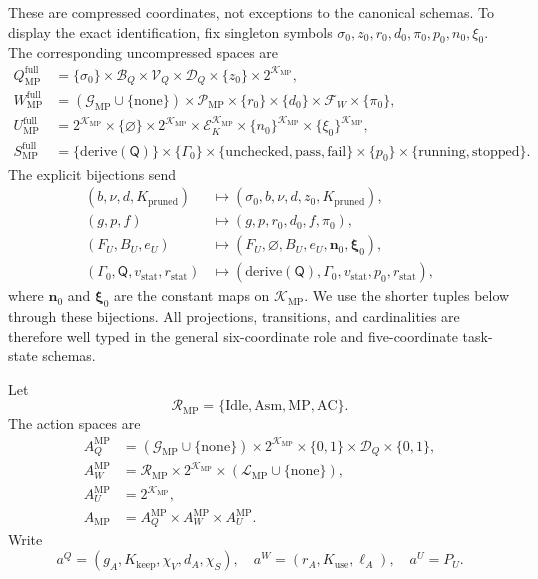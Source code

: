 \documentclass[11pt,oneside]{book}
\theoremstyle{remark}
\begin{document}
These are compressed coordinates, not exceptions to the canonical schemas.
To display the exact identification, fix singleton symbols
$\sigma_0,z_0,r_0,d_0,\pi_0,p_0,n_0,\xi_0$. The corresponding uncompressed
spaces are
\begin{align*}
Q_{\mathrm{MP}}^{\mathrm{full}}
&=\{\sigma_0\}\times\mathcal B_Q\times\mathcal V_Q
\times\mathcal D_Q\times\{z_0\}\times2^{\mathcal K_{\mathrm{MP}}},\\
W_{\mathrm{MP}}^{\mathrm{full}}
&=(\mathcal G_{\mathrm{MP}}\cup\{\mathrm{none}\})
\times\mathcal P_{\mathrm{MP}}\times\{r_0\}\times\{d_0\}
\times\mathcal F_W\times\{\pi_0\},\\
U_{\mathrm{MP}}^{\mathrm{full}}
&=2^{\mathcal K_{\mathrm{MP}}}\times\{\varnothing\}
\times2^{\mathcal K_{\mathrm{MP}}}
\times\mathcal E_K^{\mathcal K_{\mathrm{MP}}}
\times\{n_0\}^{\mathcal K_{\mathrm{MP}}}
\times\{\xi_0\}^{\mathcal K_{\mathrm{MP}}},\\
S_{\mathrm{MP}}^{\mathrm{full}}
&=\{\mathrm{derive}(\mathsf Q)\}\times\{\Gamma_0\}
\times\{\mathrm{unchecked},\mathrm{pass},\mathrm{fail}\}
\times\{p_0\}\times\{\mathrm{running},\mathrm{stopped}\}.
\end{align*}
The explicit bijections send
\begin{align*}
(b,\nu,d,K_{\mathrm{pruned}})
&\longmapsto(\sigma_0,b,\nu,d,z_0,K_{\mathrm{pruned}}),\\
(g,p,f)&\longmapsto(g,p,r_0,d_0,f,\pi_0),\\
(F_U,B_U,e_U)
&\longmapsto(F_U,\varnothing,B_U,e_U,
\boldsymbol{n}_0,\boldsymbol{\xi}_0),\\
(\Gamma_0,\mathsf Q,v_{\mathrm{stat}},r_{\mathrm{stat}})
&\longmapsto
(\mathrm{derive}(\mathsf Q),\Gamma_0,v_{\mathrm{stat}},p_0,r_{\mathrm{stat}}),
\end{align*}
where $\boldsymbol{n}_0$ and $\boldsymbol{\xi}_0$ are the constant maps on
$\mathcal K_{\mathrm{MP}}$. We use the shorter tuples below through these
bijections. All projections, transitions, and cardinalities are therefore
well typed in the general six-coordinate role and five-coordinate task-state
schemas.

Let
\[
\mathcal R_{\mathrm{MP}}=\{\mathrm{Idle},\mathrm{Asm},\mathrm{MP},\mathrm{AC}\}.
\]
The action spaces are
\begin{align*}
A_Q^{\mathrm{MP}}
&=(\mathcal G_{\mathrm{MP}}\cup\{\mathrm{none}\})
\times2^{\mathcal K_{\mathrm{MP}}}\times\{0,1\}
\times\mathcal D_Q\times\{0,1\},\\
A_W^{\mathrm{MP}}
&=\mathcal R_{\mathrm{MP}}\times2^{\mathcal K_{\mathrm{MP}}}
\times(\mathcal L_{\mathrm{MP}}\cup\{\mathrm{none}\}),\\
A_U^{\mathrm{MP}}&=2^{\mathcal K_{\mathrm{MP}}},\\
A_{\mathrm{MP}}&=A_Q^{\mathrm{MP}}\times A_W^{\mathrm{MP}}
\times A_U^{\mathrm{MP}}.
\end{align*}
Write
\[
a^Q=(g_A,K_{\mathrm{keep}},\chi_V,d_A,\chi_S),\quad
a^W=(r_A,K_{\mathrm{use}},\ell_A),\quad
a^U=P_U.
\]
\end{document}
